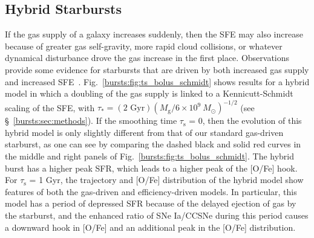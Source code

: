 \subsection{Hybrid Starbursts}
\label{bursts:sec:hybrid}
If the gas supply of a galaxy increases suddenly, then the SFE may also 
increase because of greater gas self-gravity, more rapid cloud collisions, or 
whatever dynamical disturbance drove the gas increase in the first place. 
Observations provide some evidence for starbursts that are driven by both 
increased gas supply and increased 
SFE~\citep[][and the citations therein]{Kennicutt2012}. 
Fig.~\ref{bursts:fig:ts_bolus_schmidt} shows results for a hybrid model in which a 
doubling of the gas supply is linked to a Kennicutt-Schmidt scaling of the SFE, 
with $\tau_* = (2\text{ Gyr})(M_\text{g}/6\times10^9\ M_\odot)^{-1/2}$ (see 
\S~\ref{bursts:sec:methods}). If the smoothing time $\tau_\text{s}$ = 0, then the 
evolution of this hybrid model is only slightly different from that of our 
standard gas-driven starburst, as one can see by comparing the dashed black and 
solid red curves in the middle and right panels of 
Fig.~\ref{bursts:fig:ts_bolus_schmidt}. The hybrid burst has a higher peak SFR, 
which leads to a higher peak of the [O/Fe] hook. For $\tau_\text{s}$ = 1 Gyr, 
the trajectory and [O/Fe] distribution of the hybrid model show features of 
both the gas-driven and efficiency-driven models. In particular, this model 
has a period of depressed SFR because of the delayed ejection of gas by the 
starburst, and the enhanced ratio of SNe Ia/CCSNe during this period causes a 
downward hook in [O/Fe] and an additional peak in the [O/Fe] distribution. 


